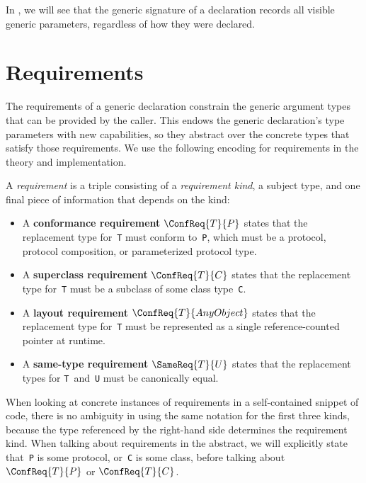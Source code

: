 \documentclass[../generics]{subfiles}
\begin{document}
In , we will see that the generic signature of a declaration records all visible generic parameters, regardless of how they were declared.

\section{Requirements}\label{requirements}

The requirements of a generic declaration constrain the generic argument types that can be provided by the caller. This endows the generic declaration's type parameters with new capabilities, so they abstract over the concrete types that satisfy those requirements. We use the following encoding for requirements in the theory and implementation.

\begin{definition}\label{requirement def}
A \emph{requirement} is a triple consisting of a \emph{requirement kind}, a subject type, and one final piece of information that depends on the kind:
\begin{itemize}
\item A \textbf{conformance requirement} $\ConfReq{T}{P}$ states that the replacement type for~\texttt{T} must conform to~\texttt{P}, which must be a protocol, protocol composition, or parameterized protocol type.
\item A \textbf{superclass requirement} $\ConfReq{T}{C}$ states that the replacement type for~\texttt{T} must be a subclass of some class type~\texttt{C}.
\item A \textbf{layout requirement} $\ConfReq{T}{AnyObject}$ states that the replacement type for~\texttt{T} must be represented as a single reference-counted pointer at runtime.
\item A \textbf{same-type requirement} $\SameReq{T}{U}$ states that the replacement types for \texttt{T}~and~\texttt{U} must be canonically equal.
\end{itemize}
\end{definition}

When looking at concrete instances of requirements in a self-contained snippet of code, there is no ambiguity in using the same notation for the first three kinds, because the type referenced by the right-hand side determines the requirement kind. When talking about requirements in the abstract, we will explicitly state that~\texttt{P} is some protocol, or~\texttt{C} is some class, before talking about $\ConfReq{T}{P}$ or $\ConfReq{T}{C}$.
\end{document}
